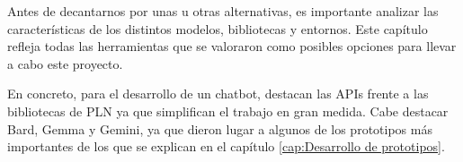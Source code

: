 Antes de decantarnos por unas u otras alternativas, es importante analizar las características de los distintos modelos, bibliotecas y entornos. Este capítulo refleja todas las herramientas que se valoraron como posibles opciones para llevar a cabo este proyecto. 

En concreto, para el desarrollo de un chatbot, destacan las APIs frente a las bibliotecas de PLN ya que simplifican el trabajo en gran medida. Cabe destacar Bard, Gemma y Gemini, ya que dieron lugar a algunos de los prototipos más importantes de los que se explican en el capítulo \ref{cap:Desarrollo de prototipos}.
 




